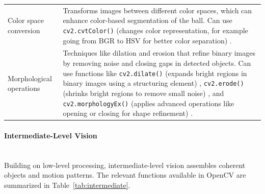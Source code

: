 \documentclass[12pt,a4paper]{article}
\begin{document}
\begin{longtable}{@{}l p{}@{}}
	Color space conversion & Transforms images between different color spaces, which can enhance color-based segmentation of the ball. Can use \texttt{cv2.cvtColor()} (changes color representation, for example going from BGR to HSV for better color separation) \parencite{opencv_color}. \\
	
	Morphological operations & Techniques like dilation and erosion that refine binary images by removing noise and closing gaps in detected objects. Can use functions like \texttt{cv2.dilate()} (expands bright regions in binary images using a structuring element) \parencite{opencv_dilate}, \texttt{cv2.erode()} (shrinks bright regions to remove small noise) \parencite{opencv_erode}, and \texttt{cv2.morphologyEx()} (applies advanced operations like opening or closing for shape refinement) \parencite{opencv_morphologyex}. \\
	\bottomrule
\end{longtable}

\paragraph{Intermediate-Level Vision}
\mbox{}\\
Building on low-level processing, intermediate-level vision assembles coherent objects and motion patterns. The relevant functions available in OpenCV are summarized in Table~\ref{tab:intermediate}.
\end{document}
